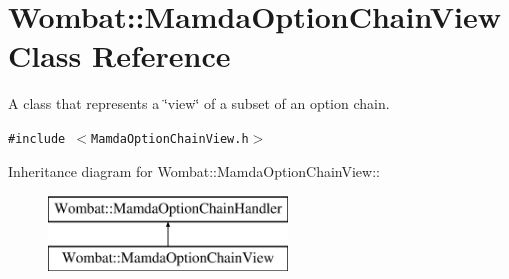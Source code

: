 \hypertarget{classWombat_1_1MamdaOptionChainView}{
\section{Wombat::Mamda\-Option\-Chain\-View Class Reference}
\label{classWombat_1_1MamdaOptionChainView}
}
A class that represents a \char`\"{}view\char`\"{} of a subset of an option chain.  


{\tt \#include $<$Mamda\-Option\-Chain\-View.h$>$}

Inheritance diagram for Wombat::Mamda\-Option\-Chain\-View::\begin{figure}[H]
\begin{center}
\leavevmode
\includegraphics[height=2cm]{classWombat_1_1MamdaOptionChainView}
\end{center}
\end{figure}
